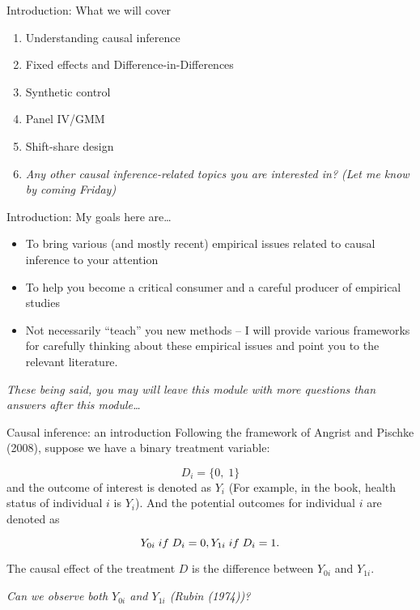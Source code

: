 \documentclass[
  ignorenonframetext,
]{beamer}
\begin{document}
\begin{frame}{Introduction: What we will cover}
\protect\hypertarget{introduction-what-we-will-cover}{}
\begin{enumerate}
\item
  Understanding causal inference
\item
  Fixed effects and Difference-in-Differences
\item
  Synthetic control
\item
  Panel IV/GMM
\item
  Shift-share design
\item
  \emph{Any other causal inference-related topics you are interested in?
  (Let me know by coming Friday)}
\end{enumerate}
\end{frame}

\begin{frame}{Introduction: My goals here are\ldots{}}
\protect\hypertarget{introduction-my-goals-here-are}{}
\begin{itemize}
\item
  To bring various (and mostly recent) empirical issues related to
  causal inference to your attention
\item
  To help you become a critical consumer and a careful producer of
  empirical studies
\item
  Not necessarily ``teach'' you new methods -- I will provide various
  frameworks for carefully thinking about these empirical issues and
  point you to the relevant literature.
\end{itemize}

\emph{These being said, you may will leave this module with more
questions than answers after this module\ldots{}}
\end{frame}

\begin{frame}{Causal inference: an introduction}
\protect\hypertarget{causal-inference-an-introduction}{}
Following the framework of Angrist and Pischke (2008), suppose we have a
binary treatment variable:

\[
D_i=\{0,\;1\} 
\] and the outcome of interest is denoted as \(Y_i\) (For example, in
the book, health status of individual \(i\) is \(Y_i\)). And the
potential outcomes for individual \(i\) are denoted as

\[
Y_{0i}\;if\;D_i=0, \\
Y_{1i}\;if\;D_i=1. \\
\]

The causal effect of the treatment \(D\) is the difference between
\(Y_{0i}\) and \(Y_{1i}\).

\emph{Can we observe both \(Y_{0i}\) and \(Y_{1i}\) (Rubin (1974))?}
\end{frame}
\end{document}
